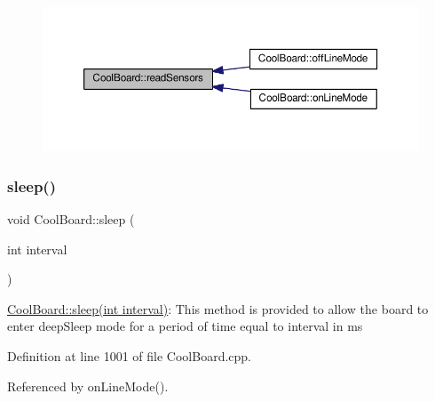 \begin{figure}[H]
\begin{center}
\leavevmode
\includegraphics[width=350pt]{classCoolBoard_ad03abdce2e65f520bbf2cff0f2d083cf_icgraph}
\end{center}
\end{figure}
\mbox{\label{classCoolBoard_a5d0c8ff93b615efd676be432de9f164a}} 
\subsubsection{\texorpdfstring{sleep()}{sleep()}}
{\footnotesize\ttfamily void Cool\+Board\+::sleep (\begin{DoxyParamCaption}\item[{int}]{interval }\end{DoxyParamCaption})}

\hyperlink{classCoolBoard_a5d0c8ff93b615efd676be432de9f164a}{Cool\+Board\+::sleep(int interval)}\+: This method is provided to allow the board to enter deep\+Sleep mode for a period of time equal to interval in ms 

Definition at line 1001 of file Cool\+Board.\+cpp.



Referenced by on\+Line\+Mode().


